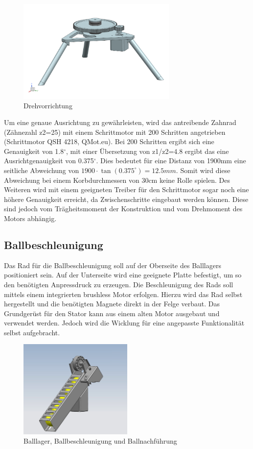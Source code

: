 \begin{figure}[h!]          
	\centering             
	\includegraphics[width=0.7\textwidth]{fig/Bild_Drehturm.png}    
	\caption{Drehvorrichtung}
	\label{fig:bild} 
\end{figure}

Um eine genaue Ausrichtung zu gewährleisten, wird das antreibende Zahnrad 
(Zähnezahl z2=25) mit einem Schrittmotor mit 200 Schritten angetrieben (Schrittmotor QSH 4218, 
QMot.eu). Bei 200 Schritten ergibt sich eine Genauigkeit von 1.8$^\circ$, mit einer 
Übersetzung von z1/z2=4.8 ergibt das eine Ausrichtgenauigkeit von 0.375$^\circ$. Dies 
bedeutet für eine Distanz von 1900mm eine seitliche Abweichung von 
$1900 \cdot \tan(0.375^\circ)= 12.5mm$. Somit wird diese Abweichung bei einem 
Korbdurchmessen von 30cm keine Rolle spielen. Des Weiteren wird mit einem 
geeigneten Treiber für den Schrittmotor sogar noch eine höhere Genauigkeit erreicht, da Zwischenschritte eingebaut werden können. Diese sind jedoch vom Trägheitsmoment der Konstruktion und vom Drehmoment des Motors abhängig. 

\subsection{Ballbeschleunigung}
Das Rad für die Ballbeschleunigung soll auf der Oberseite des Balllagers 
positioniert sein. Auf der Unterseite wird eine geeignete Platte befestigt, um 
so den benötigten Anpressdruck zu erzeugen. 
Die Beschleunigung des Rads soll mittels einem integrierten brushless Motor erfolgen. Hierzu wird das Rad selbst hergestellt und die benötigten Magnete direkt in der Felge verbaut. Das Grundgerüst für den Stator kann aus einem alten Motor ausgebaut und verwendet werden. Jedoch wird die Wicklung für eine angepasste Funktionalität selbst aufgebracht.
\begin{figure}[h!]          
	\centering             
	\includegraphics[width=0.5\textwidth]{fig/Balllager.jpg}    
	\caption{Balllager, Ballbeschleunigung und Ballnachführung}
	\label{fig:Balllager} 
\end{figure}


